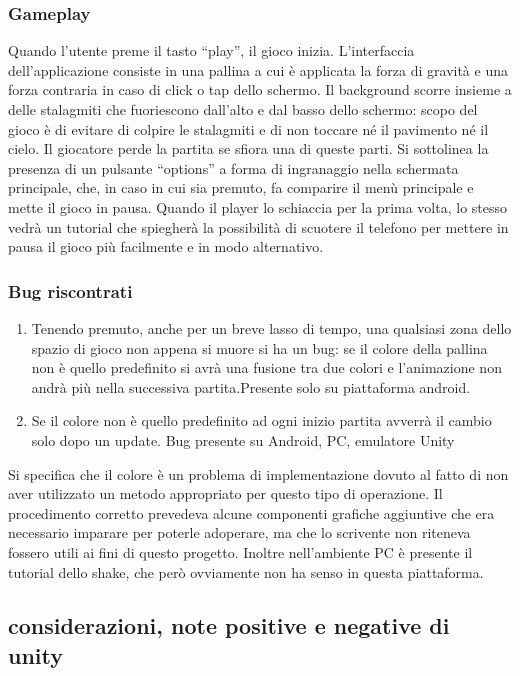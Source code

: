 \subsubsection{Gameplay}
Quando l’utente preme il tasto “play”, il gioco inizia. L’interfaccia dell’applicazione consiste in una pallina a cui è applicata la forza di gravità e una forza contraria in caso di click o tap dello schermo. Il background scorre insieme a delle stalagmiti che fuoriescono dall’alto e dal basso dello schermo: scopo del gioco è di evitare di colpire le stalagmiti e di non toccare né il pavimento né il cielo. Il giocatore perde la partita se sfiora una di queste parti.
Si sottolinea la presenza di un pulsante “options” a forma di ingranaggio nella schermata principale, che, in caso in cui sia premuto, fa comparire il menù principale e mette il gioco in pausa. Quando il player lo schiaccia per la prima volta, lo stesso vedrà un tutorial che spiegherà la possibilità di scuotere il telefono per mettere in pausa il gioco più facilmente e in modo alternativo.

\subsubsection{Bug riscontrati}
\begin{enumerate}
\item Tenendo premuto, anche per un breve lasso di tempo, una qualsiasi zona dello spazio di gioco non appena si muore si ha un bug: se il colore della pallina non è quello predefinito si avrà una fusione tra due colori e l’animazione non andrà più nella successiva partita.Presente solo su piattaforma android.
\item Se il colore non è quello predefinito ad ogni inizio partita avverrà il cambio solo dopo un update. Bug presente su Android, PC, emulatore Unity
\end{enumerate}

Si specifica che il colore è un problema di implementazione dovuto al fatto di non aver utilizzato un metodo appropriato per questo tipo di operazione. Il procedimento corretto prevedeva alcune componenti grafiche aggiuntive che era necessario imparare per poterle adoperare, ma che lo scrivente non riteneva fossero utili ai fini di questo progetto. Inoltre nell’ambiente PC è presente il tutorial dello shake, che però ovviamente non ha senso in questa piattaforma.



\subsection{considerazioni, note positive e negative di unity}

